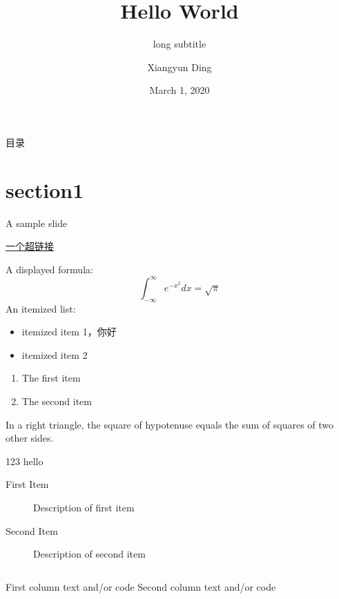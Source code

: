 \documentclass[10pt]{beamer}
\title{Hello World}
\subtitle[short subtitle]{long subtitle}
\author[dxy]{Xiangyun Ding}
\institute{Tsinghua University}
\date{March 1, 2020}  %
\begin{document}
\frame{\titlepage}

\section[目录]{}   %
\begin{frame}{目录}
\tableofcontents
\end{frame}

\section{section1}

\begin{frame}{A sample slide}

  \href{http://v.youku.com/}{一个超链接} 

A displayed formula:
\[
  \int_{-\infty}^\infty e^{-x^2}dx = \sqrt{\pi}
\]
An itemized list:

\begin{itemize}
  \item itemized item 1，你好
  \item itemized item 2
\end{itemize}
\begin{enumerate}
  \item The first item
  \item The second item
\end{enumerate}

\end{frame}

\begin{frame}

\begin{theorem}{1.1}
  In a right triangle, \small{the square of hypotenuse equals
  the sum of squares of two} other sides.
\end{theorem}

\begin{block}{123}
  hello
\end{block}

\begin{description}
  \item[First Item] Description of first item
  \vspace{0.5cm}  %
  \item[Second Item] Description of second item
\end{description}

\begin{columns}
  First column text and/or code
  Second column text and/or code
\end{columns}

\end{frame}
\end{document}
